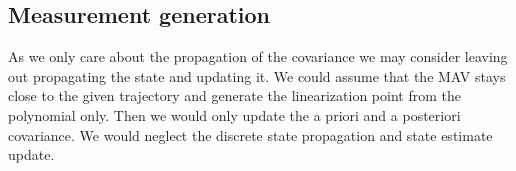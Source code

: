 \documentclass[10pt,a4paper]{article}
\renewcommand{\d}[1]{\ensuremath{\operatorname{d}\!{#1}}}
\begin{document}
\subsection*{Measurement generation}
As we only care about the propagation of the covariance we may consider leaving out propagating the state and updating it. We could assume that the MAV stays close to the given trajectory and generate the linearization point from the polynomial only. Then we would only update the a priori and a posteriori covariance. We would neglect the discrete state propagation and state estimate update.

\printbibliography
\end{document}
